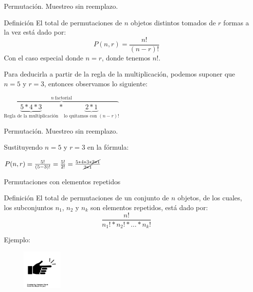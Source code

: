 \documentclass{beamer}
\begin{document}
\begin{frame}{Permutaci\'on. Muestreo sin reemplazo.}
  
  \begin{block}{Definici\'on}
    El total de permutaciones de $n$ objetos distintos tomados de $r$ formas a la
    vez est\'a dado por:
    \begin{equation}
        P(n,r) =  \frac{n !}{(n - r)!}
    \end{equation}
    Con el caso especial donde $n=r$, donde tenemos $n!$.
  \end{block}
    Para deducirla a partir de la regla de la multiplicaci\'on, podemos suponer que
    $n=5$ y $r=3$, entonces observamos lo siguiente:
  
  \begin{block}{}
    \centering
    $\overbrace{\underbrace{5*4*3}_{\text{Regla de la multiplicaci\'on}} *
    \underbrace{2*1}_{\text{lo quitamos con } (n-r)!}}^{n \ \text{factorial}}$
  \end{block}
  
\end{frame}

\begin{frame}{Permutaci\'on. Muestreo sin reemplazo.}
  
  Sustituyendo $n=5$ y $r=3$ en la f\'ormula:
  
  \begin{block}{}
    \centering
    $P(n,r) =  \frac{5 !}{(5 - 3)!} = \frac{5 !}{2!} 
            = \frac{5*4*3* \cancel{2*1}}{\cancel{2*1}} $
  \end{block}
  
\end{frame}

\begin{frame}{Permutaciones con elementos repetidos}
  \begin{block}{Definici\'on}
    El total de permutaciones de un conjunto de $n$ objetos, de los cuales, los
    subconjuntos $n_1$, $n_2$ y $n_k$ son elementos repetidos, est\'a dado por:
  \begin{equation}
    \label{eq:permutar}
    \frac{n!}{n_{1}!*n_{2}!*...*n_{k}!}
  \end{equation}
  \end{block}

  Ejemplo:
  \begin{figure}
    \includegraphics[width=2cm,angle=0,trim={1mm 216mm 1mm 200mm},clip]{figures/example-finger.png}
  \end{figure}
\end{frame}
\end{document}
